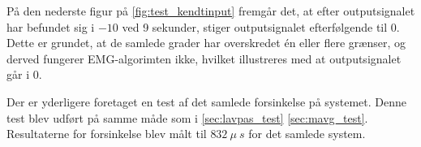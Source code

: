 På den nederste figur på \autoref{fig:test_kendtinput} fremgår det, at efter outputsignalet har befundet sig i $-10$ ved 9 sekunder, stiger outputsignalet efterfølgende til $0$. Dette er grundet, at de samlede grader har overskredet én eller flere grænser, og derved fungerer EMG-algorimten ikke, hvilket illustreres med at outputsignalet går i $0$.

Der er yderligere foretaget en test af det samlede forsinkelse på systemet. Denne test blev udført på samme måde som i \autoref{sec:lavpas_test} \autoref{sec:mavg_test}. Resultaterne for forsinkelse blev målt til $832~\mu~s$ for det samlede system. 